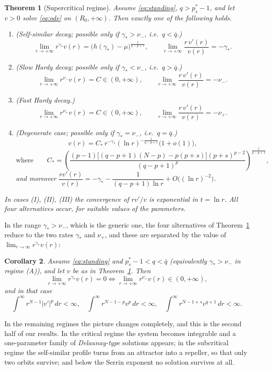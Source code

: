 \documentclass[11pt,reqno]{amsart}
\numberwithin{equation}{section}
\theoremstyle{plain}
\newtheorem{theorem}{Theorem}[section]
\newtheorem{corollary}[theorem]{Corollary}
\theoremstyle{definition}
\newcommand{\gs}{\gamma_{*}}
\begin{document}
\begin{theorem}[Supercritical regime]\label{thm:main}
Assume \eqref{eq:standing}, $q>p^{*}_{s}-1$, and let $v>0$ solve \eqref{eq:ode}
on $(R_{0},+\infty)$. Then exactly one of the following holds.
\begin{enumerate}
\item[\rm(I)] \emph{(Self-similar decay; possible only if $\gs>\nu_{-}$, i.e.\
$q<\bar q$.)}
\[
\lim_{r\to+\infty}r^{\gs}v(r)=\big(h(\gs)-\mu\big)^{\frac{1}{q-p+1}},
\qquad
\lim_{r\to+\infty}\frac{r\,v'(r)}{v(r)}=-\gs .
\]
\item[\rm(II)] \emph{(Slow Hardy decay; possible only if $\gs<\nu_{-}$, i.e.\
$q>\bar q$.)}
\[
\lim_{r\to+\infty}r^{\nu_{-}}v(r)=C\in(0,+\infty),
\qquad
\lim_{r\to+\infty}\frac{r\,v'(r)}{v(r)}=-\nu_{-} .
\]
\item[\rm(III)] \emph{(Fast Hardy decay.)}
\[
\lim_{r\to+\infty}r^{\nu_{+}}v(r)=C\in(0,+\infty),
\qquad
\lim_{r\to+\infty}\frac{r\,v'(r)}{v(r)}=-\nu_{+} .
\]
\item[\rm(IV)] \emph{(Degenerate case; possible only if $\gs=\nu_{-}$, i.e.\
$q=\bar q$.)}
\[
v(r)=C_{*}\,r^{-\gs}(\ln r)^{-\frac{1}{q-p+1}}\big(1+o(1)\big),
\]
\[
\text{where}\qquad
C_{*}=\left(\frac{(p-1)\big[(q-p+1)(N-p)-p(p+s)\big](p+s)^{p-2}}
{(q-p+1)^{p}}\right)^{\frac{1}{q-p+1}},
\]
and moreover
$\dfrac{r v'(r)}{v(r)}=-\gs-\dfrac{1}{(q-p+1)\ln r}+O\big((\ln r)^{-2}\big)$.
\end{enumerate}
In cases {\rm(I)}, {\rm(II)}, {\rm(III)} the convergence of $rv'/v$ is
exponential in $t=\ln r$. All four alternatives occur, for suitable values of
the parameters.
\end{theorem}

In the range $\gs>\nu_{-}$, which is the generic one, the four alternatives of
Theorem~\ref{thm:main} reduce to the two rates $\gs$ and $\nu_{+}$, and these
are separated by the value of $\lim_{r\to\infty} r^{\gs}v(r)$:

\begin{corollary}\label{cor:H}
Assume \eqref{eq:standing} and $p^{*}_{s}-1<q<\bar q$ (equivalently
$\gs>\nu_{-}$ in regime {\rm(A)}), and let $v$ be as in
Theorem~\ref{thm:main}. Then
\[
\lim_{r\to+\infty}r^{\gs}v(r)=0
\iff
\lim_{r\to+\infty}r^{\nu_{+}}v(r)\in(0,+\infty) ,
\]
and in that case
\[
\int^{\infty}\!r^{N-1}|v'|^{p}\,dr<\infty,\quad
\int^{\infty}\!r^{N-1-p}v^{p}\,dr<\infty,\quad
\int^{\infty}\!r^{N-1+s}v^{q+1}\,dr<\infty .
\]
\end{corollary}

In the remaining regimes the picture changes completely, and this is the second
half of our results. In the critical regime the system becomes integrable and a
one-parameter family of \emph{Delaunay-type} solutions appears; in the
subcritical regime the self-similar profile turns from an attractor into a
repeller, so that only two orbits survive; and below the Serrin exponent no
solution survives at all.
\end{document}
